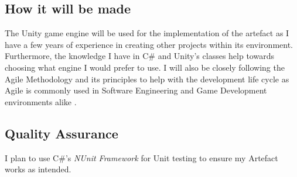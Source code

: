 \subsection{How it will be made} 
The Unity game engine\cite{unity} will be used for the implementation of the artefact as I have a few years of experience in creating other projects within its environment. Furthermore, the knowledge I have in C\# and Unity's classes help towards choosing what engine I would prefer to use.
I will also be closely following the Agile Methodology and its principles to help with the development life cycle as Agile is commonly used in Software Engineering and Game Development environments alike \cite{game-dev-agile}.

\subsection{Quality Assurance} 
I plan to use C\#'s \textit{NUnit Framework} \cite{nunit-framework} for Unit testing to ensure my Artefact works as intended.
